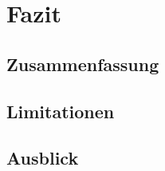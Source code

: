\chapter{Fazit}\label{chap:fazit}

\section{Zusammenfassung}\label{sec:zusammenfassung}

\section{Limitationen}\label{sec:limitationen}

\section{Ausblick}\label{sec:ausblick}
